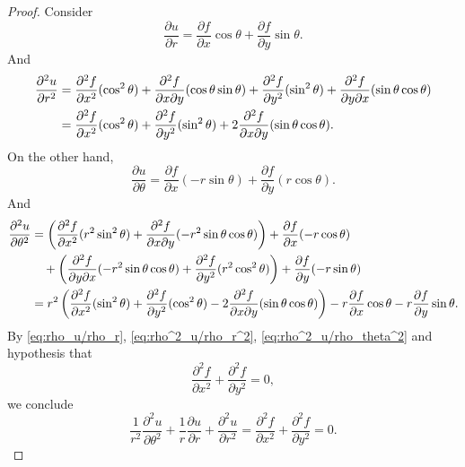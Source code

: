 \begin{Exercise}
\begin{proof}
Consider
\begin{equation}
\frac{\partial u}{\partial r} = \frac{\partial f}{\partial x}\cos \theta + \frac{\partial f}{\partial y}\sin \theta. \label{eq:rho_u/rho_r}
\end{equation}
And
\begin{align}
\frac{\partial^2 u}{\partial r^2}
&= \frac{\partial^2 f}{\partial x^2}(\cos^2 \theta) + \frac{\partial^2 f}{\partial x \partial y}(\cos \theta \sin \theta) + \frac{\partial^2 f}{\partial y^2}(\sin^2 \theta) + \frac{\partial^2 f}{\partial y \partial x}(\sin \theta \cos \theta) \notag \\
&= \frac{\partial^2 f}{\partial x^2}(\cos^2 \theta) + \frac{\partial^2 f}{\partial y^2}(\sin^2 \theta) + 2\frac{\partial^2 f}{\partial x \partial y}(\sin \theta \cos \theta).  \label{eq:rho^2_u/rho_r^2}
\end{align}
On the other hand,
$$
\frac{\partial u}{\partial \theta} = \frac{\partial f}{\partial x}(-r\sin \theta) + \frac{\partial f}{\partial y}(r\cos \theta).
$$
And
\begin{align}
\frac{\partial^2 u}{\partial \theta^2}
&= \left( \frac{\partial^2 f}{\partial x^2}(r^2\sin^2 \theta) + \frac{\partial^2 f}{\partial x \partial y}(-r^2\sin \theta \cos \theta)  \right) +\frac{\partial f}{\partial x}(-r\cos \theta) \notag \\
&\quad +\left( \frac{\partial^2 f}{\partial y \partial x}(-r^2\sin \theta \cos \theta) + \frac{\partial^2 f}{\partial y^2}(r^2 \cos^2 \theta) \right) + \frac{\partial f}{\partial y}(-r\sin \theta) \notag \\
&= r^2\left( \frac{\partial^2 f}{\partial x^2}(\sin^2 \theta) + \frac{\partial^2 f}{\partial y^2}(\cos^2 \theta) -2 \frac{\partial^2 f}{\partial x \partial y}(\sin \theta \cos \theta) \right) -r\frac{\partial f}{\partial x}\cos \theta - r\frac{\partial f}{\partial y}\sin \theta. \label{eq:rho^2_u/rho_theta^2}
\end{align}
By \eqref{eq:rho_u/rho_r}, \eqref{eq:rho^2_u/rho_r^2}, \eqref{eq:rho^2_u/rho_theta^2} and hypothesis that
$$
\frac{\partial^2 f}{\partial x^2} + \frac{\partial^2 f}{\partial y^2} = 0,
$$
we conclude
$$
\frac{1}{r^2}\frac{\partial^2 u}{\partial \theta^2} + \frac{1}{r}\frac{\partial u}{\partial r} + \frac{\partial^2 u}{\partial r^2} = \frac{\partial^2 f}{\partial x^2} + \frac{\partial^2 f}{\partial y^2} = 0.
$$
\end{proof}
\end{Exercise}